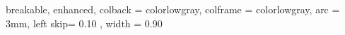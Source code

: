 {
  breakable,
  enhanced,
  colback  = colorlowgray,
  colframe = colorlowgray,
  arc      = 3mm,
  left skip= 0.10 \linewidth,
  width    = 0.90 \linewidth
}



